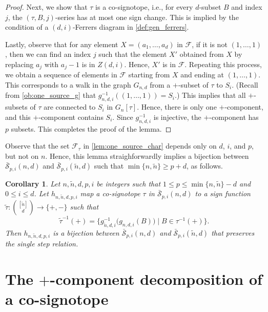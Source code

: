 \documentclass[a4paper,11pt]{amsart}
\newtheorem{corollary}[theorem]{Corollary}
\newcommand{\F}{\mathcal{F}}
\newcommand{\calS}{\mathcal{S}}
\newcommand{\tn}{\tilde{n}}
\begin{document}
\begin{proof}
    Next, we show that $\tau$ is a co-signotope, i.e., for every $d$-subset $B$ and index $j$, the $(\tau,B,j)$-series has at most one sign change.
    This is implied by the condition of a $(d,i)$-Ferrers diagram in \cref{def:gen_ferrers}.
    
    Lastly, observe that for any element $X = (a_1, \dots, a_d)$ in $\F$, if it is not $(1,\dots, 1)$, then we can find an index $j$ such that the element $X'$ obtained from $X$ by replacing $a_j$ with $a_j-1$ is in $Z(d,i)$. 
    Hence, $X'$ is in $\F$.
    Repeating this process, we obtain a sequence of elements in $\F$ starting from $X$ and ending at $(1,\dots,1)$.
    This corresponds to a walk in the graph $G_{n,d}$ from a $+$-subset of $\tau$ to $S_i$.
    (Recall from \cref{ob:one_source_g} that $g^{-1}_{n,d,i}((1, \dots, 1)) = S_i$.)
    This implies that all $+$-subsets of $\tau$ are connected to $S_i$ in $G_n[\tau]$.
    Hence, there is only one $+$-component, and this $+$-component contains $S_i$.
    Since $g^{-1}_{n,d,i}$ is injective, the $+$-component has $p$ subsets.
    This completes the proof of the lemma.
\end{proof}

Observe that the set $\F_{\tau}$ in \cref{lem:one_source_char} depends only on $d$, $i$, and $p$, but not on $n$.
Hence, this lemma straighforwardly implies a bijection between $\bar{\calS}_{p,i}(n,d)$ and $\bar{\calS}_{p,i}(\tn,d)$ such that $\min\{n,\tn\} \geq p+d$, as follows.
\begin{corollary}
\label{cor:one_source_bijection}
    Let $n,\tn,d,p,i$ be integers such that $1 \leq p \leq \min\{n,\tn\}-d$ and $0 \leq i \leq d$.
    Let $h_{n,\tn,d,p,i}$ map a co-signotope $\tau$ in $\bar{\calS}_{p,i}(n,d)$ to a sign function $\tilde{\tau}: {[\tn] \choose d} \to \{+,-\}$ such that 
    \[ 
        \tilde{\tau}^{-1}(+) = \Big\{g^{-1}_{\tn,d,i}\big(g_{n,d,i}(B)\big) \mid B \in \tau^{-1}(+)\Big\}.
    \]
    Then $h_{n,\tn,d,p,i}$ is a bijection between $\bar{\calS}_{p,i}(n,d)$ and $\bar{\calS}_{p,i}(\tn,d)$ that preserves the single step relation.
\end{corollary}


\section{The $+$-component decomposition of a co-signotope}
\label{sec:decompositionPlusComp}
\end{document}
